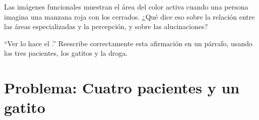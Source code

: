 \begin{exercise}[$\star\star\star$]\label{exo:g11:vision-and-brain:14}
Las imágenes funcionales muestran el área del color activa cuando una
persona imagina una manzana roja con los  cerrados. ¿Qué dice eso
sobre la relación entre las áreas especializadas y la percepción, y
sobre las alucinaciones?
\end{exercise}

\begin{exercise}[$\star\star\star$]\label{exo:g11:vision-and-brain:15}
``Ver lo hace el .'' Reescribe correctamente esta afirmación en un
párrafo, usando los tres pacientes, los gatitos y la droga.
\end{exercise}

\section{Problema: Cuatro pacientes y un gatito}

